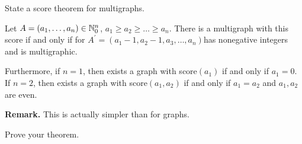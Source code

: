 
\begin{exercise}
  State a score theorem for multigraphs. %
  \begin{theorem}
     Let $A = (a_1,\dots,a_n) \in \mathbb{N}_0^n$, $a_1 \geq a_2 \geq \dots  \geq a_n$. There is a multigraph
     with this score if and only if for $A^\prime = (a_1 - 1, a_2 - 1, a_3, \dots, a_n)$has nonegative integers and is multigraphic.

     Furthermore, if $n=1$, then exists a graph with score$(a_1)$ if and only if $a_1=0$.
     If $n=2$, then exists a graph with score$(a_1, a_2)$ if and only if $a_1=a_2$ and $a_1, a_2$ are even.
  \end{theorem}
  
  
  \textbf{Remark.} This is actually
  simpler than for graphs.
\end{exercise}

\begin{exercise}
  Prove your theorem.
\end{exercise}

